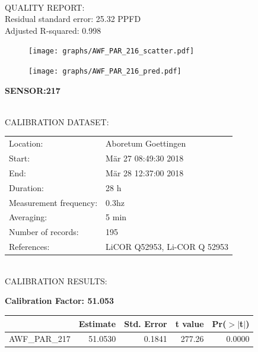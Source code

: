 \documentclass[oneside]{report}
\begin{document}
\hrulefill\\
QUALITY REPORT:\\
Residual standard error: 25.32 PPFD\\
Adjusted R-squared: 0.998



\begin{figure}[H]
  \centering
  \texttt{[image: graphs/AWF\_PAR\_216\_scatter.pdf]}
\end{figure}




\begin{figure}[H]
  \centering
  \texttt{[image: graphs/AWF\_PAR\_216\_pred.pdf]}
\end{figure}

\pagebreak


\begin{center}
\large{\textbf{SENSOR:217}}\\
\end{center}

\hrulefill\\
CALIBRATION DATASET:\\
\begin{table}[h!]
  \centering
  \label{tab:table1}
  \begin{tabular}{ll}
    Location: & Aboretum Goettingen\\ 
    
    
    Start:  & Mär 27 08:49:30 2018 \\
    End:   & Mär 28 12:37:00 2018\\ 
    Duration: & 28 h\\
    Measurement frequency: & 0.3hz\\
    Averaging:  &5 min\\
    Number of records: & 195 \\
    References: & LiCOR Q52953, Li-COR Q 52953 \\
  \end{tabular}
\end{table}

\hrulefill\\
CALIBRATION RESULTS:\\


\begin{center}
\textbf{\large{Calibration Factor: 51.053}}\\
\end{center}
\begin{table}[ht]
\centering
\begin{tabular}{rrrrr}
  \hline
 & Estimate & Std. Error & t value & Pr($>$$|$t$|$) \\ 
  \hline
AWF\_PAR\_217 & 51.0530 & 0.1841 & 277.26 & 0.0000 \\ 
   \hline
\end{tabular}
\end{table}
\end{document}
